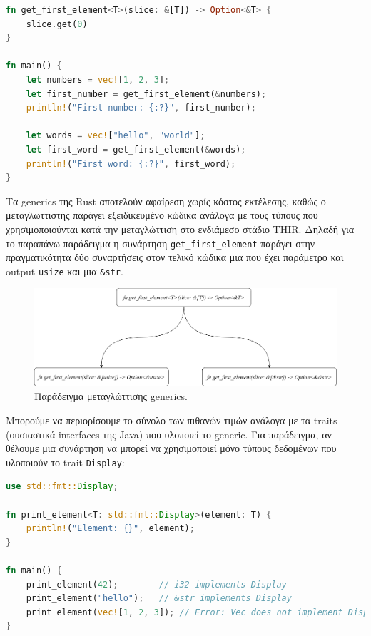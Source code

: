 \begin{lstlisting}[language=Rust]
fn get_first_element<T>(slice: &[T]) -> Option<&T> {
    slice.get(0)
}

fn main() {
    let numbers = vec![1, 2, 3];
    let first_number = get_first_element(&numbers);
    println!("First number: {:?}", first_number);

    let words = vec!["hello", "world"];
    let first_word = get_first_element(&words);
    println!("First word: {:?}", first_word);
}
\end{lstlisting}

Τα generics της Rust αποτελούν αφαίρεση χωρίς κόστος εκτέλεσης, καθώς ο
μεταγλωττιστής παράγει εξειδικευμένο κώδικα ανάλογα με τους τύπους που
χρησιμοποιούνται κατά την μεταγλώττιση στο ενδιάμεσο στάδιο THIR. Δηλαδή
για το παραπάνω παράδειγμα η συνάρτηση \verb|get_first_element| παράγει
στην πραγματικότητα δύο συναρτήσεις στον τελικό κώδικα μια που έχει παράμετρο
και output \verb|usize| και μια \verb|&str|. 

\begin{figure}[htb!]
  \centering
  \includegraphics[scale=0.3]{images/rust/rust_generics}
  \caption{Παράδειγμα μεταγλώττισης generics.}
  \label{fig:rust_generic}
\end{figure}

Μπορούμε να περιορίσουμε το σύνολο των πιθανών τιμών ανάλογα με τα
traits (ουσιαστικά interfaces της Java) που υλοποιεί το generic. Για
παράδειγμα, αν θέλουμε μια συνάρτηση να μπορεί να χρησιμοποιεί μόνο
τύπους δεδομένων που υλοποιούν το trait \verb|Display|:

\begin{lstlisting}[language=Rust]
use std::fmt::Display;

fn print_element<T: std::fmt::Display>(element: T) {
    println!("Element: {}", element);
}

fn main() {
    print_element(42);        // i32 implements Display
    print_element("hello");   // &str implements Display
    print_element(vec![1, 2, 3]); // Error: Vec does not implement Display
}
\end{lstlisting}

